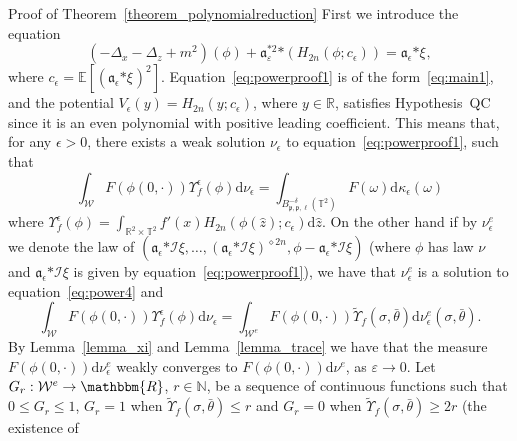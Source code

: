 \documentclass[a4paper,10pt]{article}
\newcommand{\asterisk}{\mathord{*}}
\newcommand{\mathd}{\mathrm{d}}
\newenvironment{proof*}[1]{\noindent\textbf{#1\ }}{\hspace*{\fill}$\Box$\medskip}
\begin{document}
\begin{proof*}{Proof of Theorem~\ref{theorem_polynomialreduction}}
  First we introduce the equation
  \begin{equation}
    (- \Delta_x - \Delta_z + m^2) (\phi) +
    \mathfrak{a}_{\varepsilon}^{\asterisk 2} \asterisk (H_{2 n} (\phi ;
    c_{\epsilon})) = \mathfrak{a}_{\epsilon} \asterisk \xi_{}
    \label{eq:powerproof1},
  \end{equation}
  where $c_{\epsilon} =\mathbb{E} [(\mathfrak{a}_{\epsilon} \asterisk
  \xi_{})^2]$. Equation~{\eqref{eq:powerproof1}} is of the
  form~{\eqref{eq:main1}}, and the potential $V_{\epsilon} (y) = H_{2 n} (y ;
  c_{\epsilon})$, where $y \in \mathbb{R}$, satisfies Hypothesis~QC since it
  is an even polynomial with positive leading coefficient. This means that,
  for any $\epsilon > 0$, there exists a weak solution $\nu_{\epsilon}$ to
  equation~{\eqref{eq:powerproof1}}, such that
  \[ \int_{\mathcal{W}} F (\phi (0, \cdot)) \Upsilon_f^{\epsilon} (\phi)
     \mathd \nu_{\epsilon} = \int_{B^{- \delta}_{\mathfrak{p}, \mathfrak{p},
     \ell} (\mathbb{T}^2)} F (\omega) \mathd \kappa_{\epsilon} (\omega) \]
  where $\Upsilon_f^{\epsilon} (\phi) = \int_{\mathbb{R}^2 \times
  \mathbb{T}^2} f' (x) H_{2 n} (\phi (\hat{z}) ; c_{\epsilon}) \mathd
  \hat{z}$. On the other hand if by $\nu^e_{\epsilon}$ we denote the law of
  $(\mathcal{\mathfrak{a}}_{\epsilon} \asterisk \mathcal{I} \xi, \ldots,
  (\mathcal{\mathfrak{a}}_{\epsilon} \asterisk \mathcal{I} \xi)^{\diamond 2
  n}, \phi - \mathcal{\mathfrak{a}}_{\epsilon} \asterisk \mathcal{I} \xi)$
  (where $\phi$ has law $\nu$ and $\mathcal{\mathfrak{a}}_{\epsilon} \asterisk
  \mathcal{I} \xi$ is given by equation~{\eqref{eq:powerproof1}}), we have
  that $\nu^e_{\epsilon}$ is a solution to equation~{\eqref{eq:power4}} and
  \[ \int_{\mathcal{W}} F (\phi (0, \cdot)) \Upsilon_f^{\epsilon} (\phi)
     \mathd \nu_{\epsilon} = \int_{\mathcal{W}^e} F (\phi (0, \cdot))
     \tilde{\Upsilon}_f (\sigma, \bar{\theta}) \mathd \nu^e_{\epsilon}
     (\sigma, \bar{\theta}) . \]
  By Lemma~\ref{lemma_xi} and Lemma~\ref{lemma_trace} we have that the measure
  $F (\phi (0, \cdot)) \mathd \nu_{\epsilon}^e$ weakly converges to $F (\phi
  (0, \cdot)) \mathd \nu^e$, as $\varepsilon \rightarrow 0$. Let $G_r :
  \mathcal{W}^e \rightarrow \mathbbm{R}$, $r \in \mathbb{N}$, be a sequence of
  continuous functions such that $0 \leqslant G_r \leqslant 1$, $G_r = 1$ when
  $\tilde{\Upsilon}_f (\sigma, \bar{\theta}) \leqslant r$ and $G_r = 0$ when
  $\tilde{\Upsilon}_f (\sigma, \bar{\theta}) \geqslant 2 r$ (the existence of

\end{proof*}
\end{document}
